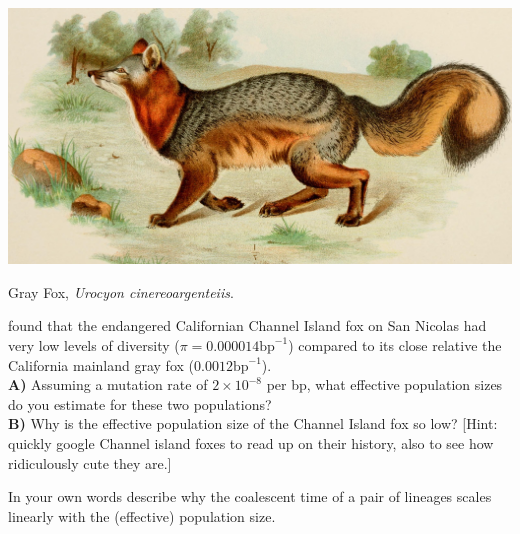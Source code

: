 \begin{marginfigure}
\begin{center}
  \includegraphics[width =
  \textwidth]{illustration_images/Quant_gen/Grey_fox/14770789583_4db7ec5164_o.jpg}  %
\end{center}
\caption{Gray Fox, {\it Urocyon cinereoargenteiis}. }
\end{marginfigure}


\begin{question}
\citet{robinson:16} found that the endangered Californian Channel Island fox on San Nicolas had very
low levels of diversity ($\pi =0.000014 \text{bp}^{-1}$) compared to
its close relative the California mainland gray fox ($0.0012\text{bp}^{-1}$). \\
{\bf A)} Assuming a mutation rate of $2\times 10^{-8}$ per bp, what
effective population sizes do you estimate for these two populations?
\\
{\bf B)} Why is the effective population size of the Channel Island fox
so low? [Hint: quickly google Channel island foxes to read up on their
history, also to see how ridiculously cute they are.]
\end{question}


\begin{question}
In your own words describe why the coalescent time of a pair of lineages scales linearly with the (effective) population size.
\end{question}


